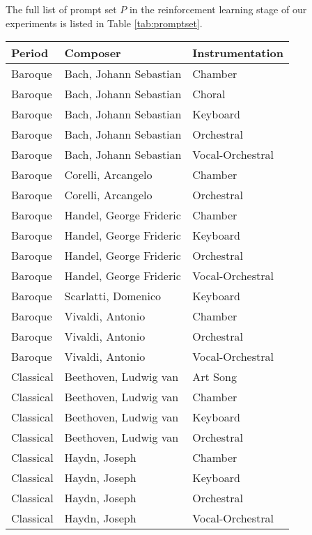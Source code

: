 The full list of prompt set $P$ in the reinforcement learning stage of our experiments is listed in Table \ref{tab:promptset}.

\begin{table}[!htbp]
    \centering
    \begin{tabular}{@{}lll@{}}
        \toprule
        Period    & Composer                  & Instrumentation \\
        \midrule
        Baroque & Bach, Johann Sebastian & Chamber \\
        Baroque & Bach, Johann Sebastian & Choral \\
        Baroque & Bach, Johann Sebastian & Keyboard \\
        Baroque & Bach, Johann Sebastian & Orchestral \\
        Baroque & Bach, Johann Sebastian & Vocal-Orchestral \\
        Baroque & Corelli, Arcangelo & Chamber \\
        Baroque & Corelli, Arcangelo & Orchestral \\
        Baroque & Handel, George Frideric & Chamber \\
        Baroque & Handel, George Frideric & Keyboard \\
        Baroque & Handel, George Frideric & Orchestral \\
        Baroque & Handel, George Frideric & Vocal-Orchestral \\
        Baroque & Scarlatti, Domenico & Keyboard \\
        Baroque & Vivaldi, Antonio & Chamber \\
        Baroque & Vivaldi, Antonio & Orchestral \\
        Baroque & Vivaldi, Antonio & Vocal-Orchestral \\
        Classical & Beethoven, Ludwig van & Art Song \\
        Classical & Beethoven, Ludwig van & Chamber \\
        Classical & Beethoven, Ludwig van & Keyboard \\
        Classical & Beethoven, Ludwig van & Orchestral \\
        Classical & Haydn, Joseph & Chamber \\
        Classical & Haydn, Joseph & Keyboard \\
        Classical & Haydn, Joseph & Orchestral \\
        Classical & Haydn, Joseph & Vocal-Orchestral \\

\end{tabular}
\end{table}
